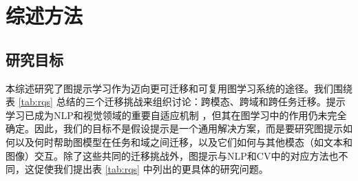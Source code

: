 \section{综述方法}\label{sec:method}

\subsection{研究目标}

本综述研究了图提示学习作为迈向更可迁移和可复用图学习系统的途径。我们围绕表 \ref{tab:rqs} 总结的三个迁移挑战来组织讨论：跨模态、跨域和跨任务迁移。提示学习已成为NLP和视觉领域的重要自适应机制 \cite{brown2020language, gao2021making,
wang2023chatvideo}，但其在图学习中的作用仍未完全确定。因此，我们的目标不是假设提示是一个通用解决方案，而是要研究图提示如何以及何时帮助图模型在任务和域之间迁移，以及它们如何与其他模态（如文本和图像）交互。除了这些共同的迁移挑战外，图提示与NLP和CV中的对应方法也不同，这促使我们提出表 \ref{tab:rqs} 中列出的更具体的研究问题。


